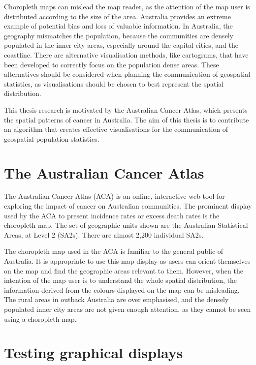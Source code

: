 \documentclass{monashthesis}
\begin{document}
Choropleth maps can mislead the map reader, as the attention of the map user is distributed according to the size of the area. Australia provides an extreme example of potential bias and loss of valuable information. In Australia, the geography mismatches the population, because the communities are densely populated in the inner city areas, especially around the capital cities, and the coastline. There are alternative visualisation methods, like cartograms, that have been developed to correctly focus on the population dense areas. These alternatives should be considered when planning the communication of geospatial statistics, as visualisations should be chosen to best represent the spatial distribution.

This thesis research is motivated by the Australian Cancer Atlas, which presents the spatial patterns of cancer in Australia. The aim of this thesis is to contribute an algorithm that creates effective visualisations for the communication of geospatial population statistics.

\hypertarget{the-australian-cancer-atlas}{%
\section{The Australian Cancer Atlas}\label{the-australian-cancer-atlas}}

The Australian Cancer Atlas (ACA) is an online, interactive web tool for exploring the impact of cancer on Australian communities. The prominent display used by the ACA to present incidence rates or excess death rates is the choropleth map. The set of geographic units shown are the Australian Statistical Areas, at Level 2 (SA2s). There are almost 2,200 individual SA2s.

The choropleth map used in the ACA is familiar to the general public of Australia. It is appropriate to use this map display as users can orient themselves on the map and find the geographic areas relevant to them.
However, when the intention of the map user is to understand the whole spatial distribution, the information derived from the colours displayed on the map can be misleading.
The rural areas in outback Australia are over emphasised, and the densely populated inner city areas are not given enough attention, as they cannot be seen using a choropleth map.

\hypertarget{testing-graphical-displays}{%
\section{Testing graphical displays}\label{testing-graphical-displays}}
\end{document}
